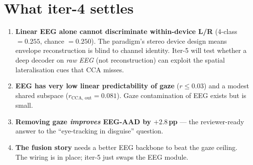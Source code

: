 \section{What iter-4 settles}

\begin{enumerate}
  \item \textbf{Linear EEG alone cannot discriminate within-device L/R}
        (4-class $= 0.255$, chance $= 0.250$). The paradigm's stereo
        device design means envelope reconstruction is blind to channel
        identity. Iter-5 will test whether a deep decoder on
        \emph{raw EEG} (not reconstruction) can exploit the spatial
        lateralisation cues that CCA misses.
  \item \textbf{EEG has very low linear predictability of gaze}
        ($r \leq 0.03$) and a modest shared subspace
        ($r_\text{CCA, out} = 0.081$). Gaze contamination of EEG exists
        but is small.
  \item \textbf{Removing gaze \emph{improves} EEG-AAD by $+2.8$\,pp} ---
        the reviewer-ready answer to the ``eye-tracking in disguise''
        question.
  \item \textbf{The fusion story} needs a better EEG backbone to beat
        the gaze ceiling. The wiring is in place; iter-5 just swaps the
        EEG module.
\end{enumerate}

